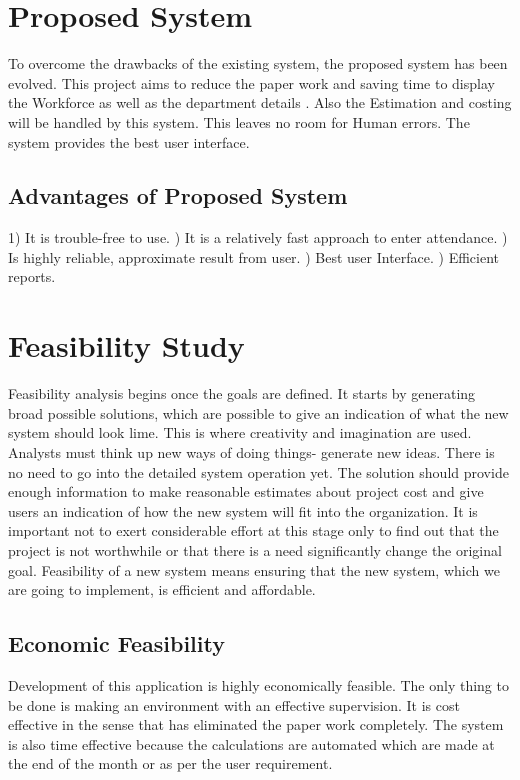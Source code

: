 \documentclass[12pt,a4paper]{report}
\begin{document}
\section{Proposed System}
To overcome the drawbacks of the existing system, the proposed system has been evolved. This project aims to reduce the paper work and saving time to display the Workforce as well as the department details . Also the Estimation and costing will be handled by this system. This leaves no room for Human errors. The system provides the best user interface. 
\subsection{Advantages of Proposed System}
1) It is trouble-free to use. 
) It is a relatively fast approach to enter attendance.
) Is highly reliable, approximate result from user.
) Best user Interface.
) Efficient reports.

\section{Feasibility Study}
Feasibility analysis begins once the goals are defined. It starts by generating broad possible solutions, which are possible to give an indication of what the new system should look lime. This is where creativity and imagination are used. Analysts must think 
up new ways of doing things- generate new ideas. There is no need to go into the detailed system operation yet. The solution should provide enough information to make reasonable estimates about project cost and give users an indication of how the new system will fit into the organization. It is important not to exert considerable effort at this stage only to find out that the project is not worthwhile or that there is a need significantly change the original goal. Feasibility of a new system means ensuring that the new system, which we are going to implement, is efficient and affordable.
\subsection{Economic Feasibility}
Development of this application is highly economically feasible. The only thing to be done is making an environment with an effective supervision. It is cost effective in the sense that has eliminated the paper work completely. The system is also time effective because the calculations are automated which are made at the end of the month or as per the user requirement.
\end{document}
